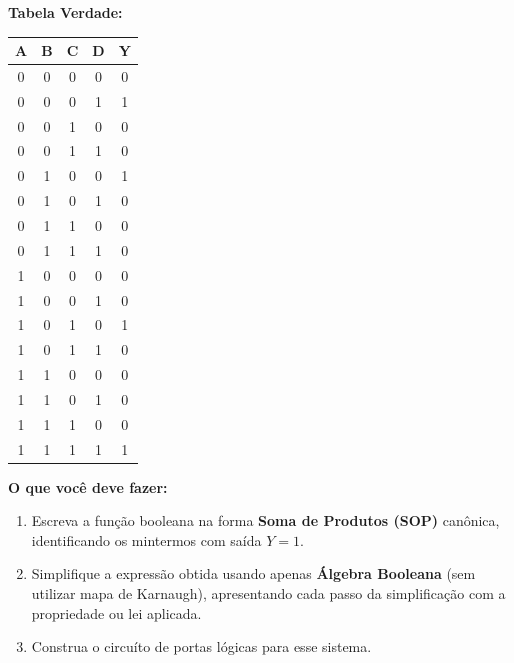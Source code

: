 \documentclass[12pt]{article}
\begin{document}
\bigskip

\noindent\textbf{Tabela Verdade:}

\medskip
\begin{center}
\renewcommand{\arraystretch}{1.25}
\begin{tabular}{|c|c|c|c||c|}
  \hline
  \textbf{A} & \textbf{B} & \textbf{C} & \textbf{D} & \textbf{Y} \\
  \hline
  0 & 0 & 0 & 0 & 0 \\
  0 & 0 & 0 & 1 & 1 \\
  0 & 0 & 1 & 0 & 0 \\
  0 & 0 & 1 & 1 & 0 \\
  0 & 1 & 0 & 0 & 1 \\
  0 & 1 & 0 & 1 & 0 \\
  0 & 1 & 1 & 0 & 0 \\
  0 & 1 & 1 & 1 & 0 \\
  1 & 0 & 0 & 0 & 0 \\
  1 & 0 & 0 & 1 & 0 \\
  1 & 0 & 1 & 0 & 1 \\
  1 & 0 & 1 & 1 & 0 \\
  1 & 1 & 0 & 0 & 0 \\
  1 & 1 & 0 & 1 & 0 \\
  1 & 1 & 1 & 0 & 0 \\
  1 & 1 & 1 & 1 & 1 \\
  \hline
\end{tabular}
\end{center}

\bigskip

\noindent\textbf{O que você deve fazer:}

\begin{enumerate}[label=\textbf{\alph*)}, leftmargin=2cm]
  \item Escreva a função booleana na forma \textbf{Soma de Produtos (SOP)} canônica,
        identificando os mintermos com saída $Y = 1$.
  \item Simplifique a expressão obtida usando apenas \textbf{Álgebra Booleana}
        (sem utilizar mapa de Karnaugh), apresentando cada passo da simplificação
        com a propriedade ou lei aplicada.
  \item Construa o circuíto de portas lógicas para esse sistema.
\end{enumerate}
\newpage
\end{document}
